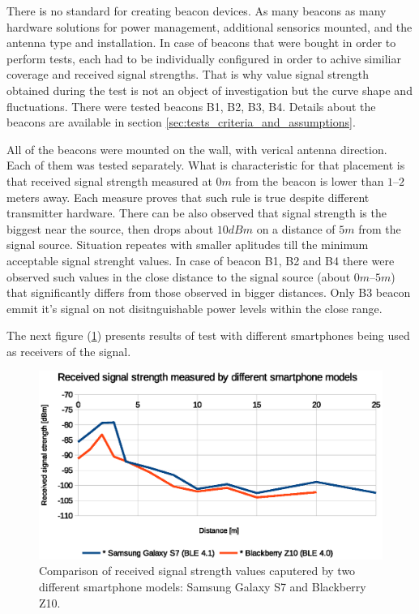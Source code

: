 \documentclass[../main.tex]{subfiles}
\begin{document}
There is no standard for creating beacon devices. As many beacons as many hardware solutions for power management, additional sensorics mounted, and the antenna type and installation. In case of beacons that were bought in order to perform tests, each had to be individually configured in order to achive similiar coverage and received signal strengths. That is why value signal strength obtained during the test is not an object of investigation but the curve shape and fluctuations. There were tested beacons B1, B2, B3, B4. Details about the beacons are available in section \ref{sec:tests_criteria_and_assumptions}.

All of the beacons were mounted on the wall, with verical antenna direction. Each of them was tested separately. What is characteristic for that placement is that received signal strength measured at $0 m$ from the beacon is lower than $1$--$2$ meters away. Each measure proves that such rule is true despite different transmitter hardware. There can be also observed that signal strength is the biggest near the source, then drops about $10dBm$ on a distance of $5m$ from the signal source. Situation repeates with smaller aplitudes till the minimum acceptable signal strenght values. In case of beacon B1, B2 and B4 there were observed such values in the close distance to the signal source (about $0m$--$5m$) that significantly differs from those observed in bigger distances. Only B3 beacon emmit it's signal on not disitnguishable power levels within the close range.

The next figure (\ref{fig:tests_case9_smartphone_comparison}) presents results of test with different smartphones being used as receivers of the signal.

\begin{figure}[!htbp]
\includegraphics[width=\textwidth, keepaspectratio]{pictures/tests_case9_smartphone_comparison}
\centering
\caption{Comparison of received signal strength values caputered by two different smartphone models: Samsung Galaxy S7 and Blackberry Z10.}
\label{fig:tests_case9_smartphone_comparison}
\end{figure}
\end{document}
